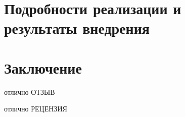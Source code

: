 \documentclass{fefu}
\begin{document}
    \section{Подробности реализации и результаты внедрения}
    
    \newpage
    \section*{Заключение}
    
    \newpage
    \printbibliography
    \newpage
    \begin{supervisorreview}{отлично}{}{}
    	ОТЗЫВ
    \end{supervisorreview}
    \begin{review}{отлично}{}
    	РЕЦЕНЗИЯ
    \end{review}
\end{document}
